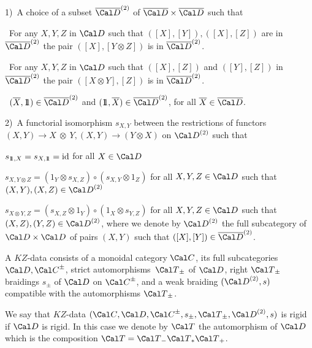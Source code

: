 \item{1)}\ A choice of a subset  $\overline{\Cal D}^{(2)}$  of
$\overline{\Cal D} \times \overline{\Cal D}$  such that


\ 	For any  $X,Y,Z$ in ${\Cal D}$  such that
$([X],[Y]), ([X],[Z])$ are in  $\overline{\Cal D}^{(2)}$  the pair
\newline
$([X],[Y \otimes Z])$ is in $\overline{\Cal D}^{(2)}$.

\ For any $X,Y,Z$ in ${\Cal D}$  such that  $([X],[Z])$  and
$([Y],[Z])$  in  $\overline{\Cal D}^{(2)}$  the pair
\newline
$([X \otimes Y], [Z])$  is in $\overline{\Cal D}^{(2)}$.

\ $(\overline{X},\ident) \in \overline{\Cal D}^{(2)}$ and
$(\ident,\overline{X}) \in  \overline{\Cal D}^{(2)}$,
for all $\overline{X} \in \overline{\Cal D}$.

\item{2)}\ A functorial isomorphism $s_{X,Y}$  between the restrictions of
functors
\newline
$(X,Y) \to X~\otimes~Y, (X,Y) \to (Y \otimes X)$  on
${\Cal D}^{(2)}$  such that

 $s_{1\!\!1,X} = s_{X,1\!\!1} = \text{id}$  for all $X \in
{\Cal D}$

 $s_{X,Y\otimes Z} = (1_Y \otimes s_{X,Z}) \circ (s_{X,Y} \otimes
1_Z)$  for all $X,Y,Z \in {\Cal D}$  such that
\newline
$(X,Y), (X,Z) \in {\Cal D}^{(2)}$

 $s_{X\otimes Y,Z} = (s_{X,Z} \otimes 1_Y) \circ (1_X \otimes
s_{Y,Z})$  for all $X,Y,Z \in {\Cal D}$  such that
\newline
$(X,Z), (Y,Z) \in {\Cal D}^{(2)}$,
\newline
where we denote by  ${\Cal D}^{(2)}$  the
full subcategory of  ${\Cal D} \times {\Cal D}$  of pairs $(X,Y)$  such that
$([X],[Y]) \in \overline{\Cal D}^{(2)}$.
\endproclaim

  A $KZ$-data consists of a monoidal category
${\Cal C}$, its full subcategories ${\Cal D}, {\Cal C}^\pm$,
strict automorphisms\   ${\Cal T}_\pm$ of ${\Cal D}$,
right ${\Cal T}_\pm$ braidings
$s_\pm$  of ${\Cal D}$  on  ${\Cal C}^\pm$,
and a weak braiding  $({\Cal D}^{(2)},s)$  compatible with the
automorphisms  ${\Cal T}_\pm$.
\endproclaim

  We say that  $KZ$-data $({\Cal C}, {\Cal D}, {\Cal C}^\pm,
s_\pm, {\Cal T}_\pm, {\Cal D}^{(2)},s)$  is rigid if ${\Cal D}$  is
rigid.  In this case we denote by ${\Cal T}$  the automorphism of ${\Cal D}$
which is the composition  ${\Cal T} = {\Cal T}_- {\Cal T}_* {\Cal T}_+$.


